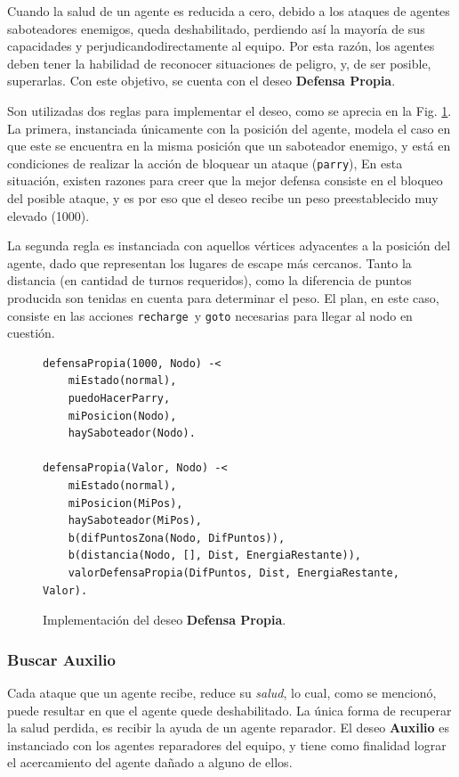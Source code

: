 \documentclass[oneside]{book}
\theoremstyle{definition}
\begin{document}
Cuando la salud de un agente es reducida a cero, debido a los ataques de 
agentes saboteadores enemigos, queda deshabilitado, perdiendo así la mayoría 
de sus capacidades y perjudicandodirectamente al equipo. Por esta razón, los 
agentes deben tener la habilidad de reconocer situaciones de peligro, y, de 
ser posible, superarlas. Con este objetivo, se cuenta con el deseo 
\textbf{Defensa Propia}.

Son utilizadas dos reglas para implementar el deseo, como se aprecia en la Fig. 
\ref{fig:deseoDefensaPropia}.
La primera, instanciada únicamente con la posición del agente, modela el caso en que este se 
encuentra en la misma posición que un saboteador enemigo, y está en condiciones de realizar 
la acción de bloquear un ataque (\texttt{parry}), En esta situación, existen razones para 
creer que la mejor defensa consiste en el bloqueo del posible ataque, y es por eso que el 
deseo recibe un peso preestablecido muy elevado (1000). 

La segunda regla es instanciada con aquellos vértices adyacentes a la posición del agente,
dado que representan los lugares de escape más cercanos. Tanto la distancia (en cantidad de 
turnos requeridos), como la diferencia de puntos producida son tenidas en cuenta para 
determinar el peso. El plan, en este caso, consiste en las acciones \texttt{recharge}\ y 
\texttt{goto} necesarias para llegar al nodo en cuestión.

\begin{figure}
\begin{verbatim}
defensaPropia(1000, Nodo) -<
    miEstado(normal),    
    puedoHacerParry,
    miPosicion(Nodo),
    haySaboteador(Nodo).

defensaPropia(Valor, Nodo) -<
    miEstado(normal),    
    miPosicion(MiPos),    
    haySaboteador(MiPos),
    b(difPuntosZona(Nodo, DifPuntos)),
    b(distancia(Nodo, [], Dist, EnergiaRestante)),
    valorDefensaPropia(DifPuntos, Dist, EnergiaRestante, Valor).
\end{verbatim}
\caption{Implementación del deseo \textbf{Defensa Propia}.}
\label{fig:deseoDefensaPropia}
\end{figure}
	
\subsubsection{Buscar Auxilio}
	
Cada ataque que un agente recibe, reduce su \textit{salud}, lo cual, como se mencionó, 
puede resultar en que el agente quede deshabilitado. La única forma de recuperar la 
salud perdida, es recibir la ayuda de un agente reparador. El deseo \textbf{Auxilio} 
es instanciado con los agentes reparadores del equipo, y tiene como finalidad lograr 
el acercamiento del agente dañado a alguno de ellos.
\end{document}
